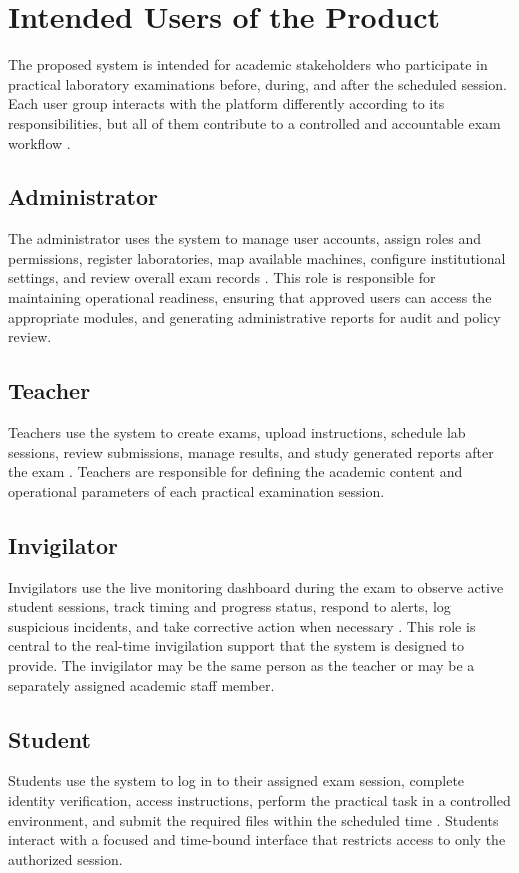 \section{Intended Users of the Product}

The proposed system is intended for academic stakeholders who participate in practical laboratory examinations before, during, and after the scheduled session. Each user group interacts with the platform differently according to its responsibilities, but all of them contribute to a controlled and accountable exam workflow \cite{sommerville}.

\subsection{Administrator}
The administrator uses the system to manage user accounts, assign roles and permissions, register laboratories, map available machines, configure institutional settings, and review overall exam records \cite{rbac1}. This role is responsible for maintaining operational readiness, ensuring that approved users can access the appropriate modules, and generating administrative reports for audit and policy review.

\subsection{Teacher}
Teachers use the system to create exams, upload instructions, schedule lab sessions, review submissions, manage results, and study generated reports after the exam \cite{eassess1}. Teachers are responsible for defining the academic content and operational parameters of each practical examination session.

\subsection{Invigilator}
Invigilators use the live monitoring dashboard during the exam to observe active student sessions, track timing and progress status, respond to alerts, log suspicious incidents, and take corrective action when necessary \cite{mit_cbt}. This role is central to the real-time invigilation support that the system is designed to provide. The invigilator may be the same person as the teacher or may be a separately assigned academic staff member.

\subsection{Student}
Students use the system to log in to their assigned exam session, complete identity verification, access instructions, perform the practical task in a controlled environment, and submit the required files within the scheduled time \cite{biometric1}. Students interact with a focused and time-bound interface that restricts access to only the authorized session.

